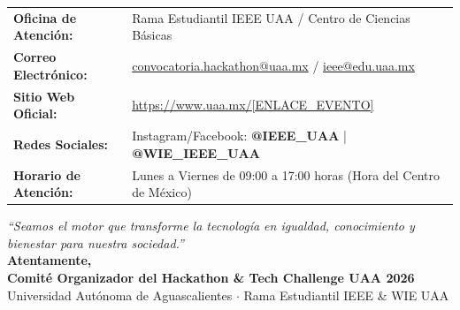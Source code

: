\documentclass[11pt,letterpaper]{article}
\begin{document}
\begin{center}
\begin{tabularx}{\textwidth}{@{}l X@{}}
\toprule
\textbf{Oficina de Atención:} & Rama Estudiantil IEEE UAA / Centro de Ciencias Básicas \\
\textbf{Correo Electrónico:} & \href{mailto:convocatoria.hackathon@uaa.mx}{convocatoria.hackathon@uaa.mx} / \href{mailto:ieee@edu.uaa.mx}{ieee@edu.uaa.mx} \\
\textbf{Sitio Web Oficial:} & \url{https://www.uaa.mx/[ENLACE_EVENTO]} \\
\textbf{Redes Sociales:} & Instagram/Facebook: \textbf{@IEEE\_UAA} | \textbf{@WIE\_IEEE\_UAA} \\
\textbf{Horario de Atención:} & Lunes a Viernes de 09:00 a 17:00 horas (Hora del Centro de México) \\
\bottomrule
\end{tabularx}
\end{center}

\vspace*{1cm}
\begin{center}
\textit{“Seamos el motor que transforme la tecnología en igualdad, conocimiento y bienestar para nuestra sociedad.”} \\[10pt]
\textbf{Atentamente,} \\[5pt]
\textbf{Comité Organizador del Hackathon \& Tech Challenge UAA 2026} \\
Universidad Autónoma de Aguascalientes $\cdot$ Rama Estudiantil IEEE \& WIE UAA
\end{center}
\end{document}
